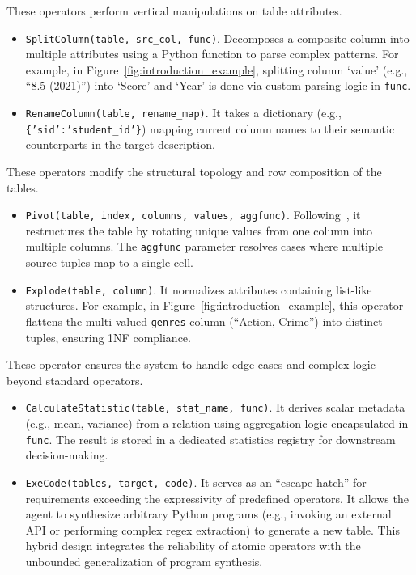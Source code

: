  These operators perform vertical manipulations on table attributes.
\begin{itemize}[leftmargin=1em]
    \item \texttt{SplitColumn(table, src\_col, func)}. Decomposes a composite column into multiple attributes using a Python function to parse complex patterns. For example, in Figure~\ref{fig:introduction_example}, splitting column `value' (e.g., ``8.5 (2021)'') into `Score' and `Year' is done via custom parsing logic in \texttt{func}.
    \item \texttt{RenameColumn(table, rename\_map)}. It takes a dictionary (e.g., {\small\texttt{\{'sid':'student\_id'\}}}) mapping current column names to their semantic counterparts in the target description.
\end{itemize}

 These operators modify the structural topology and row composition of the tables.
\begin{itemize}[leftmargin=1em]
    \item \texttt{Pivot(table, index, columns, values, aggfunc)}. Following~\cite{DBLP:journals/pvldb/LiHYWC23}, it restructures the table by rotating unique values from one column into multiple columns. The \texttt{aggfunc} parameter resolves cases where multiple source tuples map to a single cell.
    \item \texttt{Explode(table, column)}. It normalizes attributes containing list-like structures. For example, in Figure~\ref{fig:introduction_example}, this operator flattens the multi-valued \texttt{genres} column (``Action, Crime'') into distinct tuples, ensuring 1NF compliance.
\end{itemize}

 These operator ensures the system to handle edge cases and complex logic beyond standard operators.
\begin{itemize}[leftmargin=1em]
    \item \texttt{CalculateStatistic(table, stat\_name, func)}. It derives scalar metadata (e.g., mean, variance) from a relation using aggregation logic encapsulated in \texttt{func}. The result is stored in a dedicated statistics registry for downstream decision-making.
    \item \texttt{ExeCode(tables, target, code)}. It serves as an ``escape hatch'' for requirements exceeding the expressivity of predefined operators. It allows the agent to synthesize arbitrary Python programs (e.g., invoking an external API or performing complex regex extraction) to generate a new table. This hybrid design integrates the reliability of atomic operators with the unbounded generalization of program synthesis.
\end{itemize}


